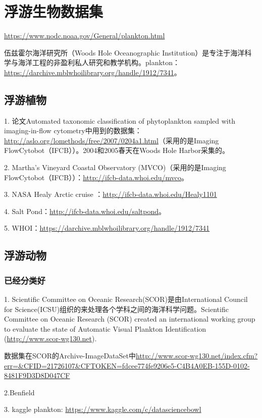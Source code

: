 \section{浮游生物数据集}
\url{https://www.nodc.noaa.gov/General/plankton.html}

伍兹霍尔海洋研究所（Woods Hole Oceanographic Institution）是专注于海洋科学与海洋工程的非盈利私人研究和教学机构。plankton：\url{https://darchive.mblwhoilibrary.org/handle/1912/7341}。

\subsection{浮游植物}

1. 论文Automated taxonomic classification of phytoplankton sampled with imaging-in-flow cytometry中用到的数据集：\url{http://aslo.org/lomethods/free/2007/0204a1.html}（采用的是Imaging FlowCytobot（IFCB））。2004和2005春天在Woods Hole Harbor采集的。

2. Martha’s Vineyard Coastal Observatory (MVCO)（采用的是Imaging FlowCytobot（IFCB））：\url{http://ifcb-data.whoi.edu/mvco}。

3. NASA Healy Arctic cruise ：\url{http://ifcb-data.whoi.edu/Healy1101}

4. Salt Pond：\url{http://ifcb-data.whoi.edu/saltpond}。

5. WHOI：\url{https://darchive.mblwhoilibrary.org/handle/1912/7341}


\subsection{浮游动物}

\subsubsection{已经分类好}
1. Scientific Committee on Oceanic Research(SCOR)是由International Council for Science(ICSU)组织的来处理各个学科之间的海洋科学问题。Scientific Committee on Oceanic Research (SCOR) created an international working group to evaluate the state of Automatic Visual Plankton Identification (\url{http://www.scor-wg130.net})\cite{gorsky2010digital}.

数据集在SCOR的Archive-ImageDataSet中\url{http://www.scor-wg130.net/index.cfm?err=&CFID=21726107&CFTOKEN=fdcee774fe9206e5-C4B4A0EB-155D-0102-8481F9D3D8D047CF}

2.Benfield

3. kaggle plankton: \url{https://www.kaggle.com/c/datasciencebowl}

